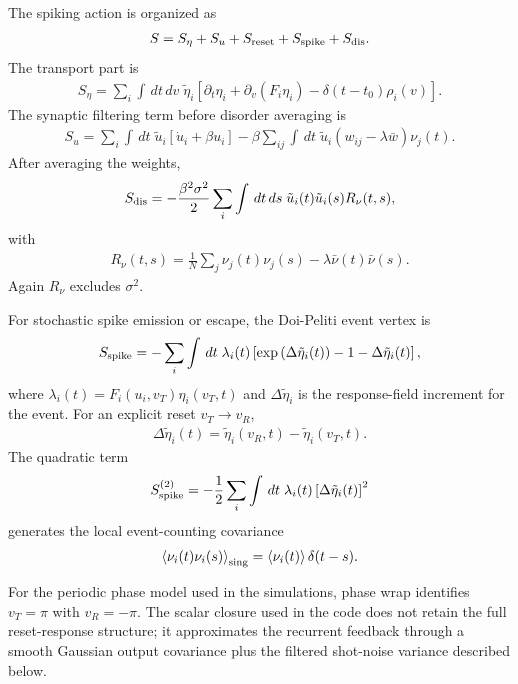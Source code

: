 \documentclass[pre,preprint,preprintnumbers,aps,eqsecnum,superscriptaddress,notitlepage,showpacs,floatfix]{revtex4-1}
\newcommand{\dd}{\,d}
\newcommand{\avg}[1]{\left\langle #1 \right\rangle}
\begin{document}
The spiking action is organized as
\begin{align}
S=S_\eta+S_u+S_{\rm reset}+S_{\rm spike}+S_{\rm dis}.
\label{eq:full_spiking_action_decomp}
\end{align}
The transport part is
\begin{align}
S_\eta
=
\sum_i\int\dd t\dd v\;
\tilde\eta_i
\left[\partial_t\eta_i+
\partial_v(F_i\eta_i)-\delta(t-t_0)\rho_i(v)\right].
\label{eq:Seta_transport}
\end{align}
The synaptic filtering term before disorder averaging is
\begin{align}
S_u
=
\sum_i\int\dd t\;\tilde u_i[\dot u_i+\beta u_i]
-
\beta\sum_{ij}\int\dd t\;\tilde u_i
\left(w_{ij}-\lambda\bar w\right)\nu_j(t).
\label{eq:Su_before_avg_clean}
\end{align}
After averaging the weights,
\begin{align}
S_{\rm dis}
=
-
\frac{\beta^2\sigma^2}{2}
\sum_i\int\dd t\dd s\;
\tilde u_i(t)\tilde u_i(s)R_\nu(t,s),
\label{eq:Sdis_clean}
\end{align}
with
\begin{align}
R_\nu(t,s)
=
\frac1N\sum_j\nu_j(t)\nu_j(s)
-
\lambda\bar\nu(t)\bar\nu(s).
\label{eq:Rnu_def_clean}
\end{align}
Again $R_\nu$ excludes $\sigma^2$.

For stochastic spike emission or escape, the Doi-Peliti event vertex is
\begin{align}
S_{\rm spike}
=
-
\sum_i\int\dd t\;\lambda_i(t)
\left[
\exp\left(\Delta\tilde\eta_i(t)\right)-1-\Delta\tilde\eta_i(t)
\right],
\label{eq:Sspike_clean}
\end{align}
where $\lambda_i(t)=F_i(u_i,v_T)\eta_i(v_T,t)$ and
$\Delta\tilde\eta_i$ is the response-field increment for the event.  For an
explicit reset $v_T\to v_R$,
\begin{align}
\Delta\tilde\eta_i(t)=\tilde\eta_i(v_R,t)-\tilde\eta_i(v_T,t).
\end{align}
The quadratic term
\begin{align}
S_{\rm spike}^{(2)}
=
-
\frac12\sum_i\int\dd t\;\lambda_i(t)
\left[\Delta\tilde\eta_i(t)\right]^2
\label{eq:Sspike_quadratic}
\end{align}
generates the local event-counting covariance
\begin{align}
\avg{\nu_i(t)\nu_i(s)}_{\rm sing}
=
\avg{\nu_i(t)}\delta(t-s).
\label{eq:spike_train_sing_cov}
\end{align}

For the periodic phase model used in the simulations, phase wrap identifies
$v_T=\pi$ with $v_R=-\pi$.  The scalar closure used in the code does not
retain the full reset-response structure; it approximates the recurrent
feedback through a smooth Gaussian output covariance plus the filtered
shot-noise variance described below.
\end{document}
